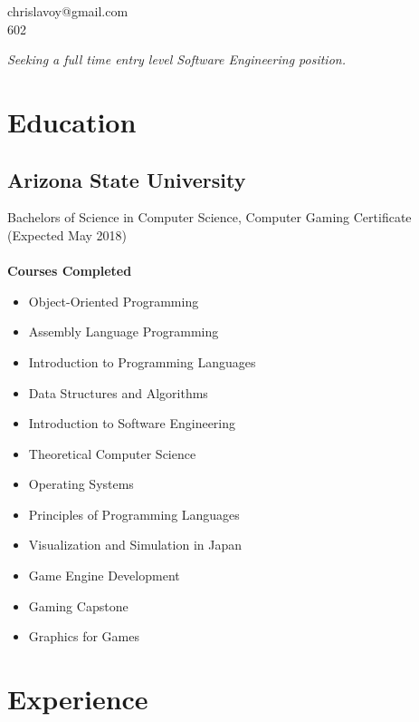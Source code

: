 \documentclass[letterpaper, 10pt]{article}
\makeatletter
\renewcommand{\maketitle}
{\begin{center}
{\Large\bfseries
\theauthor}

chrislavoy@gmail.com\\
602\--999\--2734
\end{center}
}
\makeatother
\begin{document}
\author{Chris LaVoy}

\maketitle

\vspace{-2em}
\begin{center}
\em Seeking a full time entry level Software Engineering position.
\end{center}

\vspace{-2em}

\section{Education}

\subsection{Arizona State University}

Bachelors of Science in Computer Science, Computer Gaming Certificate (Expected May 2018)
\\
\\
\textbf{Courses Completed}
\vspace{-1em}
\begin{multicols}{2}
\begin{itemize}
\setlength\itemsep{-0.25em}
\item Object-Oriented Programming
\item Assembly Language Programming
\item Introduction to Programming Languages
\item Data Structures and Algorithms
\item Introduction to Software Engineering
\item Theoretical Computer Science
\item Operating Systems
\item Principles of Programming Languages
\item Visualization and Simulation in Japan
\item Game Engine Development
\item Gaming Capstone
\item Graphics for Games
\end{itemize}
\end{multicols}

\section{Experience}
\end{document}
